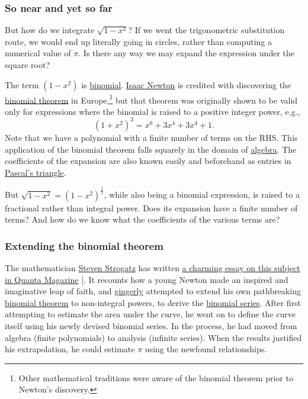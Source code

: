 \documentclass[
  a4paper,
]{article}
\begin{document}
\subsubsection{So near and yet so far}\label{so-near-and-yet-so-far}

But how do we integrate \(\sqrt{1-x^2}\)? If we went the trigonometric
substitution route, we would end up literally going in circles, rather
than computing a numerical value of \(\pi\). Is there any way we may
expand the expression under the square root?

The term \({(1 - x^2)}\) is
\href{https://www.google.com/search?q=binomial}{binomial}.
\href{https://en.wikipedia.org/wiki/Isaac_Newton}{Isaac Newton} is
credited with discovering the
\href{https://www.mathsisfun.com/algebra/binomial-theorem.html}{binomial
theorem} in Europe,\footnote{Other mathematical traditions were aware of
  the binomial theorem prior to Newton's discovery.} but that theorem
was originally shown to be valid only for expressions where the binomial
is raised to a positive integer power, e.g., \[
(1 + x^2)^3 = x^6 + 3x^4 + 3x^4 +1.
\] Note that we have a polynomial with a finite number of terms on the
RHS. This application of the binomial theorem falls squarely in the
domain of \href{https://www.britannica.com/science/algebra}{algebra}.
The coefficients of the expansion are also known easily and beforehand
as entries in
\href{https://www.britannica.com/science/Pascals-triangle}{Pascal's
triangle}.

But \(\sqrt{1 - x^2} = (1 - x^2)^{\frac{1}{2}}\), while also being a
binomial expression, is raised to a fractional rather than integral
power. Does its expansion have a finite number of terms? And how do we
know what the coefficients of the various terms are?

\subsubsection{Extending the binomial
theorem}\label{extending-the-binomial-theorem}

The mathematician
\href{https://en.wikipedia.org/wiki/Steven_Strogatz}{Steven Strogatz}
has written
\href{https://www.quantamagazine.org/how-isaac-newton-discovered-the-binomial-power-series-20220831/}{a
charming essay on this subject in Quanta Magazine}
{[}\citeproc{ref-strogatz-newton-2022}{27}{]}. It recounts how a young
Newton made an inspired and imaginative leap of faith, and
\href{https://www.merriam-webster.com/dictionary/gingerly}{gingerly}
attempted to extend his own pathbreaking
\href{https://en.wikipedia.org/wiki/Binomial_theorem}{binomial theorem}
to non-integral powers, to derive the
\href{https://en.wikipedia.org/wiki/Binomial_series}{binomial series}.
After first attempting to estimate the area under the curve, he went on
to define the curve itself using his newly devised binomial series. In
the process, he had moved from algebra (finite polynomials) to analysis
(infinite series). When the results justified his extrapolation, he
could estimate \(\pi\) using the newfound relationships.
\end{document}
